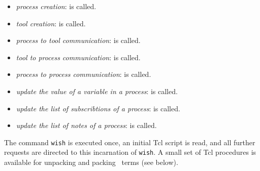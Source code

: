 \begin{itemize}
  \begin{itemize}
  \item \emph{process creation}:
     is
    called.
  \item \emph{tool creation}:  is called.
  \item \emph{process to tool communication}:
     is
    called.
  \item \emph{tool to process communication}:
     is
    called.
  \item \emph{process to process communication}:
     is
    called.
  \item \emph{update the value of a variable in a process}:
     is called.
  \item \emph{update the list of subscribtions of a process}:
     is called.
  \item \emph{update the list of notes of a process}:
     is called.
  \end{itemize}
\end{itemize}

\noindent The command {\tt wish} is executed once, an initial Tcl script
is read, and all further requests are directed to this incarnation
of {\tt wish}. A small set of Tcl procedures is available for
unpacking and packing \TB\ terms (see below).

